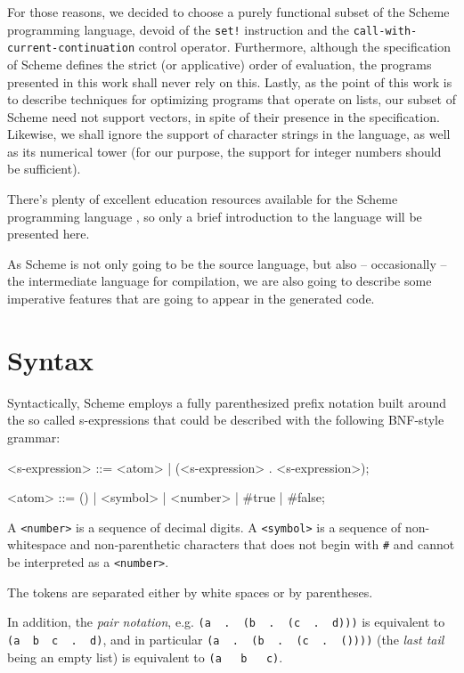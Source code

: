 For those reasons, we decided to choose a purely functional subset
of the Scheme programming language\cite{R5RS}, devoid of the \texttt{set!}
instruction and the \texttt{call-with-current-continuation} control
operator. Furthermore, although the specification of Scheme defines the strict
(or applicative) order of evaluation, the programs presented in this
work shall never rely on this. Lastly, as the point of this work
is to describe techniques for optimizing programs that operate on lists,
our subset of Scheme need not support vectors, in spite of their presence
in the specification. Likewise, we shall ignore the support of character
strings in the language, as well as its numerical tower (for our purpose,
the support for integer numbers should be sufficient).

There's plenty of excellent education resources available for the Scheme
programming language \cite{SICP} \cite{HTDP} \cite{EOPL}
\cite{FriedmanSpringer1993} \cite{FriedmanFelleisen1996} \cite{Dybvig2009}
\cite{Sitaram2003} \cite{Godek2016}, so only a brief introduction to
the language will be presented here.

As Scheme is not only going to be the source language, but also -- occasionally
-- the intermediate language for compilation, we are also going to describe
some imperative features that are going to appear in the generated code.

\section{Syntax}

Syntactically, Scheme employs a fully parenthesized prefix notation
built around the so called s-expressions that could be described
with the following BNF-style grammar:
\begin{Snippet}
<s-expression> ::= <atom> | (<s-expression> . <s-expression>);

<atom> ::= () | <symbol> | <number> | #true | #false;
\end{Snippet}

A \texttt{<number>} is a sequence of decimal digits. A \texttt{<symbol>}
is a sequence of non-whitespace and non-parenthetic characters that
does not begin with \texttt{\#} and cannot be interpreted as
a \texttt{<number>}.

The tokens are separated either by white spaces or by parentheses.

In addition, the \textit{pair notation}, e.g. 
\texttt{(a\,\,.\,\,(b\,\,.\,\,(c\,\,.\,\,d)))}
is equivalent to \texttt{(a\,\,b\,\,c\,\,.\,\,d)}, and in particular
\texttt{(a\,\,.\,\,(b\,\,.\,\,(c\,\,.\,\,())))} (the \textit{last tail} being an
empty list) is equivalent to \texttt{(a\,\,\,b\,\,\,c)}.

